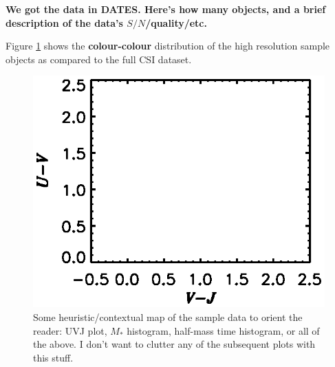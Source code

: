 \documentclass[a4paper,fleqn,usenatbib]{mnras}
\newcommand{\Mstel}{M_\ast}
\newcommand{\bfr}{\bf\color{red}}
\newcommand{\bfb}{\color{myblue}}
\begin{document}
{\bfr We got the data in DATES. Here's how many objects, and a brief description of the data's
$S/N$/quality/etc.}

Figure \ref{fig:sample} shows the {\bfr {\it UVJ} colour-colour} distribution of the high resolution
sample objects as compared to the full CSI dataset.

\begin{figure}
	\centering
	\includegraphics[width = \columnwidth, trim=1cm 0.7cm 0cm 3cm]{context}
	\caption{\bfb Some heuristic/contextual map of the sample data to orient the reader: UVJ plot, 
			$\Mstel$ histogram, half-mass time histogram, or all of the above. I don't want to 
			clutter any of the subsequent plots with this stuff.}
	\label{fig:sample}
\end{figure}

\end{document}
